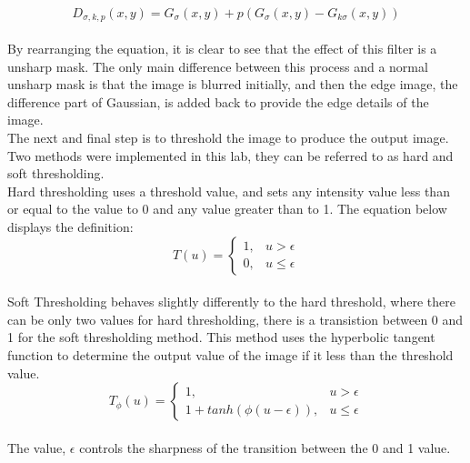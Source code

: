 \documentclass{article}
\begin{document}
	\begin{equation}
	D_{\sigma,k,p}(x,y) = G_{\sigma}(x,y) + p(G_{\sigma}(x,y) - G_{k\sigma}(x,y) ) 
	\end{equation}\\
	
	By rearranging the equation, it is clear to see that the effect of this filter is a unsharp mask. The only main difference between this process and a normal unsharp mask is that the image is blurred initially, and then the edge image, the difference part of Gaussian, is added back to provide the edge details of the image.\\
	
	The next and final step is to threshold the image to produce the output image. Two methods were implemented in this lab, they can be referred to as hard and soft thresholding.\\
	
	Hard thresholding uses a threshold value, and sets any intensity value less than or equal to the value to 0 and any value greater than to 1. The equation below displays the definition:\\
	
	\begin{equation}
	T(u) = \begin{cases} 
	1, & u > \epsilon\\
	0, & u \leq \epsilon
	\end{cases} 
	\end{equation}\\
	
	Soft Thresholding behaves slightly differently to the hard threshold, where there can be only two values for hard thresholding, there is a transistion between 0 and 1 for the soft thresholding method. This method uses the hyperbolic tangent function to determine the output value of the image if it less than the threshold value.\\
	
	 \begin{equation}
	 T_{\phi}(u) = \begin{cases} 
	 1, & u > \epsilon\\
	 1 + tanh(\phi(u - \epsilon)), & u \leq \epsilon
	 \end{cases} 
	 \end{equation}\\
	
	The value, $\epsilon $ controls the sharpness of the transition between the 0 and 1 value.\\ 
	
\end{document}
